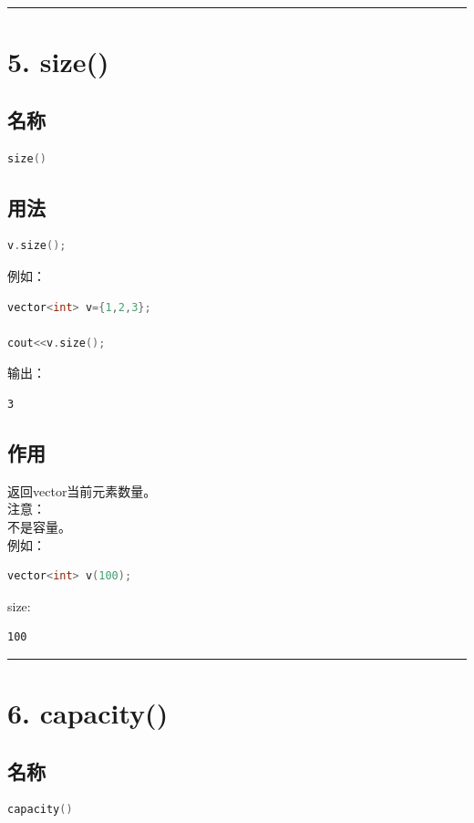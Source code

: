 \documentclass[10pt,twocolumn]{extarticle}
\begin{document}
\noindent\rule{\linewidth}{0.4pt}

\section{5. size()}

\subsection{名称}
\begin{lstlisting}[language=C++]
size()
\end{lstlisting}

\subsection{用法}
\begin{lstlisting}[language=C++]
v.size();
\end{lstlisting}
例如：
\begin{lstlisting}[language=C++]
vector<int> v={1,2,3};

cout<<v.size();
\end{lstlisting}
输出：
\begin{lstlisting}
3
\end{lstlisting}

\subsection{作用}
返回vector当前元素数量。\\
注意：\\
不是容量。\\
例如：
\begin{lstlisting}[language=C++]
vector<int> v(100);
\end{lstlisting}
size:
\begin{lstlisting}
100
\end{lstlisting}

\noindent\rule{\linewidth}{0.4pt}

\section{6. capacity()}

\subsection{名称}
\begin{lstlisting}[language=C++]
capacity()
\end{lstlisting}
\end{document}
